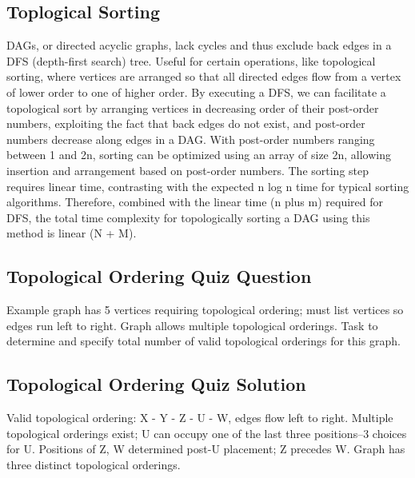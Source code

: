 \subsection*{Toplogical Sorting}
DAGs, or directed acyclic graphs, lack cycles and thus exclude back edges in a DFS (depth-first search) tree.
Useful for certain operations, like topological sorting, where vertices are arranged so that all directed edges flow from a vertex of lower order to one of higher order.
By executing a DFS, we can facilitate a topological sort by arranging vertices in decreasing order of their post-order numbers, exploiting the fact that back edges do not exist, and post-order numbers decrease along edges in a DAG\@.
With post-order numbers ranging between 1 and 2n, sorting can be optimized using an array of size 2n, allowing insertion and arrangement based on post-order numbers.
The sorting step requires linear time, contrasting with the expected n log n time for typical sorting algorithms.
Therefore, combined with the linear time (n plus m) required for DFS, the total time complexity for topologically sorting a DAG using this method is linear (N + M).

\subsection*{Topological Ordering Quiz Question}
Example graph has 5 vertices requiring topological ordering; must list vertices so edges run left to right.
Graph allows multiple topological orderings.
Task to determine and specify total number of valid topological orderings for this graph.

\subsection*{Topological Ordering Quiz Solution}
Valid topological ordering: X - Y - Z - U - W, edges flow left to right.
Multiple topological orderings exist; U can occupy one of the last three positions--3 choices for U\@.
Positions of Z, W determined post-U placement; Z precedes W\@.
Graph has three distinct topological orderings.

